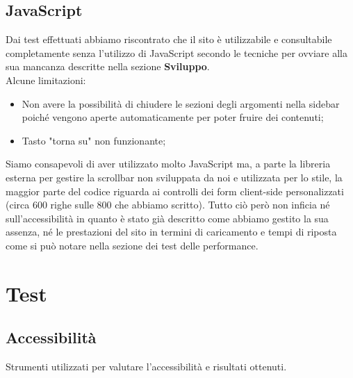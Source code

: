 \documentclass[12pt]{article}
\begin{document}
	\subsection{JavaScript}
	Dai test effettuati abbiamo riscontrato che il sito è utilizzabile e consultabile completamente senza l'utilizzo di JavaScript secondo le tecniche per ovviare alla sua mancanza descritte nella sezione \textbf{Sviluppo}. \\
	Alcune limitazioni:
	\begin{itemize}
		\item Non avere la possibilità di chiudere le sezioni degli argomenti nella sidebar poiché vengono aperte automaticamente per poter fruire dei contenuti;
		\item Tasto "torna su" non funzionante;
	\end{itemize}
	Siamo consapevoli di aver utilizzato molto JavaScript ma, a parte la libreria esterna per gestire la scrollbar non sviluppata da noi e utilizzata per lo stile, la maggior parte del codice riguarda ai controlli dei form client-side personalizzati (circa 600 righe sulle 800 che abbiamo scritto).
	Tutto ciò però non inficia né sull'accessibilità in quanto è stato già descritto come abbiamo gestito la sua assenza, né le prestazioni del sito in termini di caricamento e tempi di riposta come si può notare nella sezione dei test delle performance.
	
	\section{Test}
	\subsection{Accessibilità}
	Strumenti utilizzati per valutare l'accessibilità e risultati ottenuti.
\end{document}
